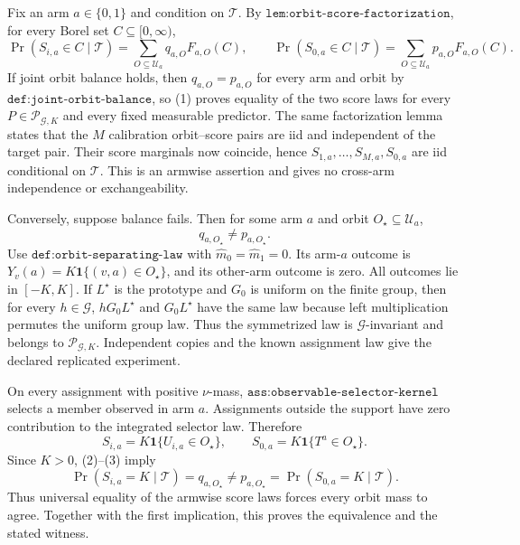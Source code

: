 Fix an arm \(a\in\{0,1\}\) and condition on \(\mathcal T\). By \(\texttt{lem:orbit-score-factorization}\), for every Borel set \(C\subseteq[0,\infty)\),
\[
\Pr(S_{i,a}\in C\mid\mathcal T)=\sum_{O\subseteq\mathcal U_a}q_{a,O}F_{a,O}(C),\qquad\Pr(S_{0,a}\in C\mid\mathcal T)=\sum_{O\subseteq\mathcal U_a}p_{a,O}F_{a,O}(C).
\tag{1}
\]
If joint orbit balance holds, then \(q_{a,O}=p_{a,O}\) for every arm and orbit by \(\texttt{def:joint-orbit-balance}\), so (1) proves equality of the two score laws for every \(P\in\mathcal P_{\mathcal G,K}\) and every fixed measurable predictor. The same factorization lemma states that the \(M\) calibration orbit--score pairs are iid and independent of the target pair. Their score marginals now coincide, hence \(S_{1,a},\ldots,S_{M,a},S_{0,a}\) are iid conditional on \(\mathcal T\). This is an armwise assertion and gives no cross-arm independence or exchangeability.

Conversely, suppose balance fails. Then for some arm \(a\) and orbit \(O_\star\subseteq\mathcal U_a\),
\[
q_{a,O_\star}\ne p_{a,O_\star}.
\tag{2}
\]
Use \(\texttt{def:orbit-separating-law}\) with \(\widehat m_0=\widehat m_1=0\). Its arm-\(a\) outcome is \(Y_v(a)=K\mathbf 1\{(v,a)\in O_\star\}\), and its other-arm outcome is zero. All outcomes lie in \([-K,K]\). If \(L^\star\) is the prototype and \(G_0\) is uniform on the finite group, then for every \(h\in\mathcal G\), \(hG_0L^\star\) and \(G_0L^\star\) have the same law because left multiplication permutes the uniform group law. Thus the symmetrized law is \(\mathcal G\)-invariant and belongs to \(\mathcal P_{\mathcal G,K}\). Independent copies and the known assignment law give the declared replicated experiment.

On every assignment with positive \(\nu\)-mass, \(\texttt{ass:observable-selector-kernel}\) selects a member observed in arm \(a\). Assignments outside the support have zero contribution to the integrated selector law. Therefore
\[
S_{i,a}=K\mathbf 1\{U_{i,a}\in O_\star\},\qquad S_{0,a}=K\mathbf 1\{T^a\in O_\star\}.
\tag{3}
\]
Since \(K>0\), (2)--(3) imply
\[
\Pr(S_{i,a}=K\mid\mathcal T)=q_{a,O_\star}\ne p_{a,O_\star}=\Pr(S_{0,a}=K\mid\mathcal T).
\]
Thus universal equality of the armwise score laws forces every orbit mass to agree. Together with the first implication, this proves the equivalence and the stated witness.